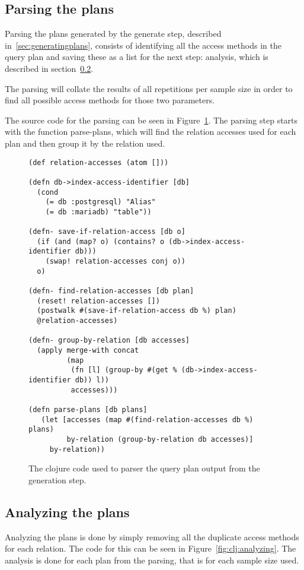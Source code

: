 \subsection{Parsing the plans}\label{sec:parsing}
Parsing the plans generated by the generate step, described
in~\ref{sec:generatingplans}, consists of identifying all the access
methods in the query plan and saving these as a list for the next step:
analysis, which is described in section~\ref{sec:analyzingplans}.

The parsing will collate the results of all repetitions per sample size
in order to find all possible access methods for those two parameters.

The source code for the parsing can be seen in Figure~\ref{fig:clj:parsing}. The
parsing step starts with the function parse-plans, which will find the relation
accesses used for each plan and then group it by the relation used.

\begin{figure}[ht]
\begin{verbatim}
(def relation-accesses (atom []))

(defn db->index-access-identifier [db]
  (cond
    (= db :postgresql) "Alias"
    (= db :mariadb) "table"))

(defn- save-if-relation-access [db o]
  (if (and (map? o) (contains? o (db->index-access-identifier db)))
    (swap! relation-accesses conj o))
  o)

(defn- find-relation-accesses [db plan]
  (reset! relation-accesses [])
  (postwalk #(save-if-relation-access db %) plan)
  @relation-accesses)

(defn- group-by-relation [db accesses]
  (apply merge-with concat
         (map
          (fn [l] (group-by #(get % (db->index-access-identifier db)) l))
          accesses)))

(defn parse-plans [db plans]
   (let [accesses (map #(find-relation-accesses db %) plans)
         by-relation (group-by-relation db accesses)]
     by-relation))
   \end{verbatim}
   \caption[The clojure code to parse a query]{The clojure code used to parser
     the query plan output from the generation step.}
\label{fig:clj:parsing}
\end{figure}

\subsection{Analyzing the plans}\label{sec:analyzingplans}
Analyzing the plans is done by simply removing all the duplicate access methods
for each relation. The code for this can be seen in
Figure~\ref{fig:clj:analyzing}. The analysis is done for each plan from the
parsing, that is for each sample size used.

